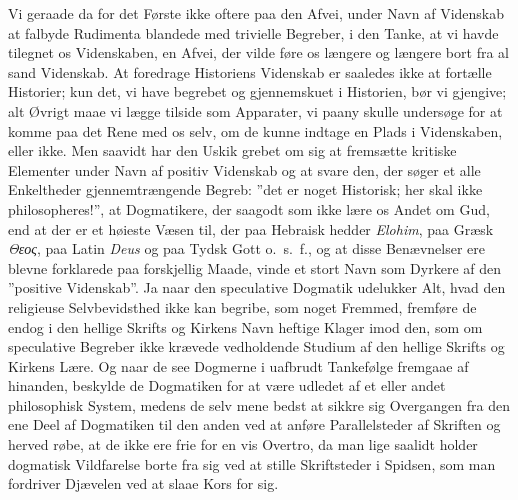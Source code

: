 \documentclass[12pt]{book}
\newcommand{\opage}[1]{\marginnote{\footnotesize\textit{[#1]}}}
\begin{document}
\opage{33} Vi geraade da for det Første ikke oftere paa den Afvei, under Navn af
Videnskab at falbyde Rudimenta blandede med trivielle Begreber, i den
Tanke, at vi havde tilegnet os Videnskaben, en Afvei, der vilde føre
os længere og længere bort fra al sand Videnskab. At foredrage
Historiens Videnskab er saaledes ikke at fortælle Historier; kun det,
vi have begrebet og gjennemskuet i Historien, bør vi gjengive; alt
Øvrigt maae vi lægge tilside som Apparater, vi paany skulle undersøge
for at komme paa det Rene med os selv, om de kunne indtage en Plads i
Videnskaben, eller ikke. Men saavidt har den Uskik grebet om sig at
fremsætte kritiske Elementer under Navn af positiv Videnskab og at
svare den, der søger et alle Enkeltheder gjennemtrængende Begreb:
”det er noget Historisk; her skal ikke philosopheres!”, at
Dogmatikere, der saagodt som ikke lære os Andet om Gud, end at der er
et høieste Væsen til, der paa Hebraisk hedder \emph{Elohim}, paa
Græsk \textit{Θεος}, paa Latin \textit{Deus} og paa Tydsk Gott
o.~s.~f., og at disse Benævnelser ere blevne forklarede paa forskjellig
Maade, vinde et stort Navn som Dyrkere af den ”positive Videnskab”. Ja
naar den speculative Dogmatik udelukker Alt, hvad den religieuse
Selvbevidsthed ikke kan begribe, som noget Fremmed, fremføre de endog
i den hellige Skrifts og Kirkens Navn heftige Klager imod den, som om
speculative Begreber ikke krævede vedholdende Studium af den hellige
Skrifts og Kirkens Lære. Og naar de see Dogmerne i uafbrudt
Tankefølge fremgaae af hinanden, beskylde de Dogmatiken for at være
udledet af et eller andet philosophisk System, medens de selv mene
bedst at sikkre sig Overgangen fra den ene Deel af Dogmatiken til den
anden ved at anføre Parallelsteder af Skriften og herved røbe, at de
ikke ere frie for en vis Overtro, da man lige saalidt holder dogmatisk
Vildfarelse borte fra sig ved at stille
\opage{34} Skriftsteder i Spidsen, som man fordriver Djævelen ved at slaae Kors
for sig.
\end{document}
